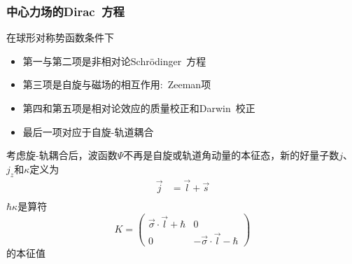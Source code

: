 \frame
{
	\frametitle{中心力场的\textrm{Dirac~}方程}
	在球形对称势函数条件下
	\fontsize{9.5pt}{5.2pt}
	\begin{itemize}
		\item 第一与第二项是非相对论\textrm{Schr\"odinger~}方程
		\item 第三项是自旋与磁场的相互作用:~\textrm{Zeeman}项
		\item 第四和第五项是相对论效应的质量校正和\textrm{Darwin~}校正
		\item 最后一项对应于自旋-轨道耦合
	\end{itemize}
	考虑旋-轨耦合后，波函数$\Psi$不再是自旋或轨道角动量的本征态，新的好量子数$j$、$j_z$和$\kappa$定义为
	$$\begin{aligned}
		\vec j&=\vec l+\vec s\\
	\end{aligned}$$
	$\hbar\kappa$是算符
	\begin{displaymath}
		K=\left( 
		\begin{matrix}
			\vec{\sigma}\cdot\vec l+\hbar &0\\
			0 &-\vec{\sigma}\cdot\vec l-\hbar
		\end{matrix}
		\right)
	\end{displaymath}
	的本征值
%	
}

